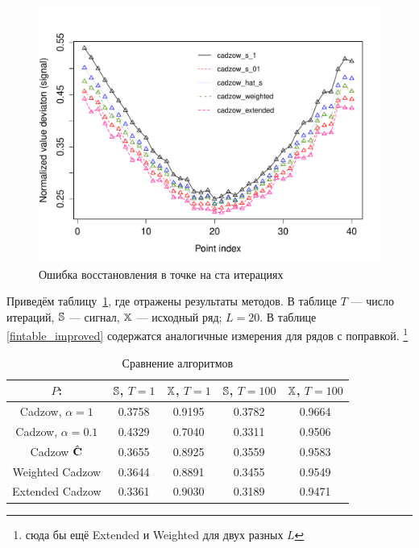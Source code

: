 \documentclass[12pt,a4paper,fleqn,leqno]{article}
\begin{document}
\begin{figure}[!hhh] 
\begin{center}
\includegraphics[width = 15cm]{s1_it100.pdf}
\caption{Ошибка восстановления в точке на ста итерациях}
\label{fig:s1_it100}
\end{center}
\end{figure}


Приведём таблицу~\ref{fintable}, где отражены результаты методов.
В таблице $T$ --- число итераций, $\mathbb{S}$ --- сигнал, $\mathbb{X}$ --- исходный ряд; $L=20$. В таблице \ref{fintable_improved} содержатся аналогичные измерения для рядов с поправкой. 
\footnote{сюда бы ещё Extended и Weighted для двух разных $L$}

\begin{table}[!hhh]
\begin{center}
\caption{Сравнение алгоритмов}\label{fintable}
\begin{tabular}{|c|c|c|c|c|}
\hline
$P$: & $\mathbb{S}$, $T = 1$ & $\mathbb{X}$, $T = 1$ & $\mathbb{S}$, $T = 100$ & $\mathbb{X}$, $T = 100$  \\
\hline
Cadzow, $\alpha = 1$ & 0.3758 & 0.9195 & 0.3782 & 0.9664 \\
\hline
Cadzow, $\alpha = 0.1$ & 0.4329 & 0.7040 & 0.3311 & 0.9506 \\
\hline
Cadzow $\hat{\mathbf{C}}$ & 0.3655 & 0.8925 & 0.3559 & 0.9583 \\
\hline
Weighted Cadzow & 0.3644 & 0.8891 & 0.3455 & 0.9549 \\
\hline
Extended Cadzow & 0.3361 & 0.9030 & 0.3189 & 0.9471 \\
\hline
\end{tabular}
\end{center}
\end{table}
\end{document}
